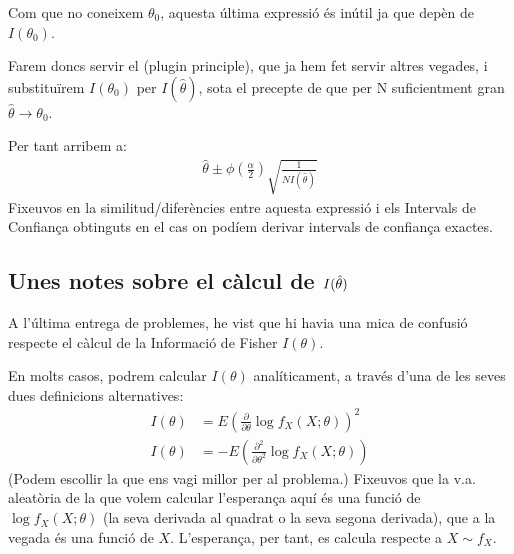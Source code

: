 \documentclass[letterpaper,10pt,english]{sphinxmanual}
\begin{document}
Com que no coneixem \(\theta_0\), aquesta última expressió és inútil ja que depèn
de \(I(\theta_0)\).

Farem doncs servir el  (plug\sphinxhyphen{}in principle),
que ja hem fet servir altres vegades, i substituïrem \(I(\theta_0)\) per \(I(\hat{\theta})\),
sota el precepte de que per N suficientment gran \(\hat{\theta} \to \theta_0\).

Per tant arribem a:
\begin{equation*}
\begin{split}\hat{\theta} \pm \phi\left(\frac{\alpha}{2}\right) \sqrt{\frac{1}{N I(\hat{\theta})}}\end{split}
\end{equation*}
Fixeu\sphinxhyphen{}vos en la similitud/diferències entre aquesta expressió i els Intervals de Confiança obtinguts
en el cas on podíem derivar intervals de confiança exactes.


\subsection{Unes notes sobre el càlcul de \protect\(I(\hat{\theta})\protect\)}
\label{\detokenize{0_Intro/0_3_Estimacio:unes-notes-sobre-el-calcul-de-i-hat-theta}}
A l’última entrega de problemes, he vist que hi havia una mica de confusió
respecte el càlcul de la Informació de Fisher \(I(\theta)\).

En molts casos, podrem calcular \(I(\theta)\) analíticament,
a través d’una de les seves dues definicions alternatives:
\begin{equation*}
\begin{split}I(\theta) &= E( \frac{\partial}{\partial \theta} \log f_X(X;\theta))^2 \\
I(\theta) &= - E( \frac{\partial^2}{\partial \theta^2} \log f_X(X;\theta))\end{split}
\end{equation*}
(Podem escollir la que ens vagi millor per al problema.) Fixeu\sphinxhyphen{}vos que la v.a.
aleatòria de la que volem calcular l’esperança aquí és una funció de
\(\log f_X(X;\theta)\) (la seva derivada al quadrat o la seva  segona derivada), que a la vegada és una funció de \(X\).
L’esperança, per tant, es calcula respecte a \(X \sim f_X\).
\end{document}
